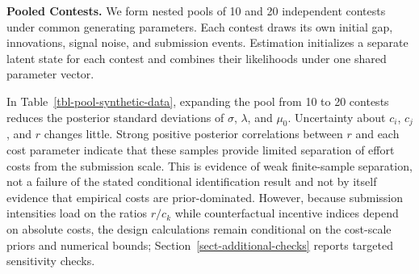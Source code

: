 \documentclass[mnsc]{informs3}
\begin{document}
{\textbf{Pooled Contests.}}
We form nested pools of 10 and 20 independent contests under common generating parameters. Each contest draws its own initial gap, innovations, signal noise, and submission events. Estimation initializes a separate latent state for each contest and combines their likelihoods under one shared parameter vector.

In Table~\ref{tbl-pool-synthetic-data}, expanding the pool from 10 to 20 contests reduces the posterior standard deviations of $\sigma$, $\lambda$, and $\mu_0$. Uncertainty about $c_i$, $c_j$, and $r$ changes little. Strong positive posterior correlations between $r$ and each cost parameter indicate that these samples provide limited separation of effort costs from the submission scale.
{This is evidence of weak finite-sample separation, not a failure of the stated conditional identification result and not by itself evidence that empirical costs are prior-dominated. However, because submission intensities load on the ratios $r/c_k$ while counterfactual incentive indices depend on absolute costs, the design calculations remain conditional on the cost-scale priors and numerical bounds; Section~\ref{sect-additional-checks} reports targeted sensitivity checks.}
\end{document}
